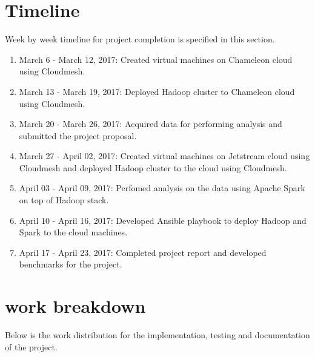 \documentclass[9pt,twocolumn,twoside]{../../styles/osajnl}
\begin{document}
\section{Timeline}

Week by week timeline for project completion is specified in this section.

\begin{enumerate}

\item {March 6 - March 12, 2017: } Created virtual machines on Chameleon
  cloud using Cloudmesh.
  
\item {March 13 - March 19, 2017: } Deployed Hadoop cluster to Chameleon
  cloud using Cloudmesh.

\item {March 20 - March 26, 2017: } Acquired data for performing
  analysis and submitted the project proposal.

\item {March 27 - April 02, 2017: } Created virtual machines on
  Jetstream cloud using Cloudmesh and deployed Hadoop cluster to the
  cloud using Cloudmesh.

\item {April 03 - April 09, 2017: } Perfomed analysis on the data using
  Apache Spark on top of Hadoop stack.
  
\item {April 10 - April 16, 2017: } Developed Ansible playbook to deploy
  Hadoop and Spark to the cloud machines. 

\item {April 17 - April 23, 2017: } Completed project report and developed
  benchmarks for the project.

\end{enumerate}


\section{work breakdown} 

Below is the work distribution for the implementation, testing and documentation of the project.
\end{document}
